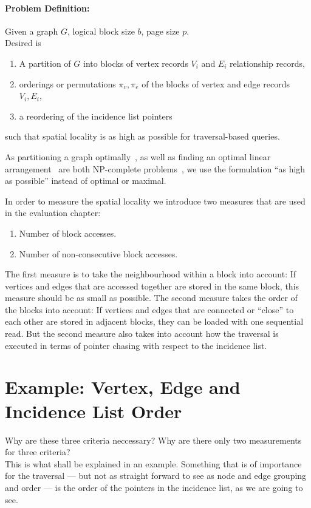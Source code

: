     \paragraph{Problem Definition:} Given a graph $G$, logical block size $b$, page size $p$. \\
    Desired is 
    \begin{enumerate}
     \item A partition of $G$ into blocks of vertex records $V_i$ and $E_i$ relationship records, 
     \item orderings or permutations $\pi_v, \pi_e$ of the blocks of vertex and edge records $V_i, E_i$,
     \item a reordering of the incidence list pointers
    \end{enumerate}
    such that spatial locality is as high as possible for traversal-based queries.
    
    As partitioning a graph optimally~\autocite{andreev2006balanced}, as well as finding an optimal linear arrangement~\autocite{garey1974some} are both NP-complete problems~\autocite{lewis1983computers}, we use the formulation ``as high as possible'' instead of optimal or maximal.
    
    In order to measure the spatial locality we introduce two measures that are used in the evaluation chapter:
    \begin{enumerate}
     \item Number of block accesses.
     \item Number of non-consecutive block accesses.
    \end{enumerate}
    The first measure is to take the neighbourhood within a block into account: If vertices and edges that are accessed together are stored in the same block, this measure should be as small as possible.
    The second measure takes the order of the blocks into account: 
    If vertices and edges that are connected or ``close'' to each other are stored in adjacent blocks, they can be loaded with one sequential read.
    But the second measure also takes into account how the traversal is executed in terms of pointer chasing with respect to the incidence list.
    
\section{Example: Vertex, Edge and Incidence List Order}
  Why are these three criteria neccessary? Why are there only two measurements for three criteria? \\
  This is what shall be explained in an example.
  Something that is of importance for the traversal --- but not as straight forward to see as node and edge grouping and order --- is the order of the pointers in the incidence list, as we are going to see.
  
